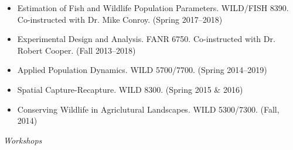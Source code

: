 \begin{itemize}

\item Estimation of Fish and Wildlife Population Parameters. WILD/FISH
  8390. Co-instructed with Dr. Mike Conroy. (Spring 2017--2018)

\item Experimental Design and Analysis. FANR 6750. Co-instructed with
  Dr. Robert Cooper. (Fall 2013--2018)

\item Applied Population Dynamics. WILD 5700/7700. (Spring 2014--2019)

\item Spatial Capture-Recapture. WILD 8300. (Spring 2015 \& 2016)

\item Conserving Wildlife in Agriclutural Landscapes. WILD
  5300/7300. (Fall, 2014) 

\end{itemize}

\vspace{0.5cm}

{\it Workshops}

